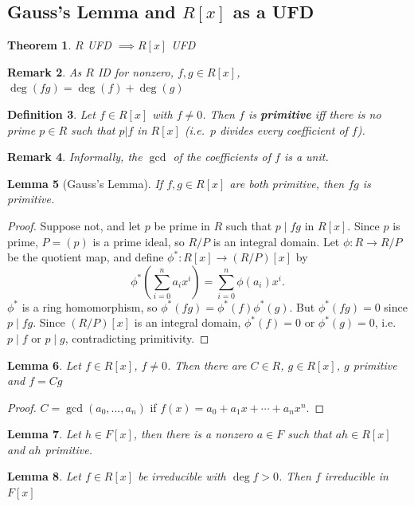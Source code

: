 \documentclass[a4paper,12pt]{article}
\newtheorem{thm}{Theorem}[section]
\newtheorem{lem}[thm]{Lemma}
\newtheorem{defn}[thm]{Definition}
\newtheorem{rmk}[thm]{Remark}
\begin{document}
\subsection{Gauss's Lemma and $R[x]$ as a UFD}
\begin{thm}
    $R$ UFD $\implies R[x]$ UFD
\end{thm}
\begin{rmk}
    As $R$ ID for nonzero, $f,g\in R[x]$, $\deg(fg)=\deg(f)+\deg(g)$
\end{rmk}
\begin{defn}
    Let $f\in R[x]$ with $f\neq 0$. Then $f$ is \textbf{primitive} iff there is no prime $p\in R$ such that $p | f$ in $R[x]$ (i.e.\ $p$ divides every coefficient of $f$).
\end{defn}
\begin{rmk}
    Informally, the $\gcd$ of the coefficients of $f$ is a unit.
\end{rmk}
\begin{lem}[Gauss's Lemma]
    If $f,g\in R[x]$ are both primitive, then $fg$ is primitive. 
\end{lem}
\begin{proof}
    Suppose not, and let $p$ be prime in $R$ such that $p\mid fg$ in $R[x]$. Since $p$ is prime, $P=(p)$ is a prime ideal, so $R/P$ is an integral domain. Let $\phi:R\to R/P$ be the quotient map, and define $\phi^*:R[x]\to (R/P)[x]$ by
    \[
        \phi^* \left( \sum_{i=0}^n a_ix^i \right)=\sum_{i=0}^n \phi(a_i)x^i.
    \]
    $\phi^*$ is a ring homomorphism, so $\phi^*(fg)=\phi^*(f)\phi^*(g)$. But $\phi^*(fg)=0$ since $p\mid fg$. Since $(R/P)[x]$ is an integral domain, $\phi^*(f)=0$ or $\phi^*(g)=0$, i.e.\ $p\mid f$ or $p\mid g$, contradicting primitivity.
\end{proof}
\begin{lem}
    Let $f\in R[x]$, $f\neq 0$. Then there are $C\in R$, $g\in R[x]$, $g$ primitive and $f=Cg$
\end{lem}
\begin{proof}
    $C=\gcd(a_0,...,a_n)$ if $f(x)=a_0+a_1x+\cdots+a_nx^n$.  
\end{proof}
\begin{lem}
    Let $h\in F[x]$, then there is a nonzero $a\in F$ such that $ah\in R[x]$ and $ah$ primitive. 
\end{lem}
\begin{lem}
    Let $f\in R[x]$ be irreducible with $\deg f>0$. Then $f$ irreducible in $F[x]$
\end{lem}
\end{document}
